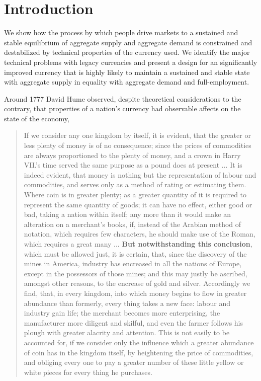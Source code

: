 \section{Introduction}

We show how the process by which people drive markets to a sustained and stable equilibrium of
aggregate supply and aggregate demand is constrained and destabilized by technical properties of the
currency used. We identify the major technical problems with legacy currencies and present a design
for an significantly improved currency that is highly likely to maintain a sustained and stable
state with aggregate supply in equality with aggregate demand and full-employment.

Around 1777 David Hume observed, despite theoretical considerations to the contrary, that properties of
a nation's currency had observable affects on the state of the economy,

\begin{quotation}
If we consider any one kingdom by itself, it is evident, that the greater or less plenty of money is
    of no consequence; since the prices of commodities are always proportioned to the plenty of
    money, and a crown in Harry VII.’s time served the same purpose as a pound does at present ...
    It is indeed evident, that money is nothing but the representation of labour and commodities,
    and serves only as a method of rating or estimating them. Where coin is in greater plenty; as a
    greater quantity of it is required to represent the same quantity of goods; it can have no
    effect, either good or bad, taking a nation within itself; any more than it would make an
    alteration on a merchant’s books, if, instead of the Arabian method of notation, which requires
    few characters, he should make use of the Roman, which requires a great many ... \textbf{But notwithstanding this conclusion}, which must be allowed just, it is certain, that, since the
    discovery of the mines in America, industry has encreased in all the nations of Europe, except
    in the possessors of those mines; and this may justly be ascribed, amongst other reasons, to the
    encrease of gold and silver.  Accordingly we find, that, in every kingdom, into which money
    begins to flow in greater abundance than formerly, every thing takes a new face: labour and
    industry gain life; the merchant becomes more enterprising, the manufacturer more diligent and
    skilful, and even the farmer follows his plough with greater alacrity and attention. This is not
    easily to be accounted for, if we consider only the influence which a greater abundance of coin
    has in the kingdom itself, by heightening the price of commodities, and obliging every one to
    pay a greater number of these little yellow or white pieces for every thing he purchases.
\end{quotation}

